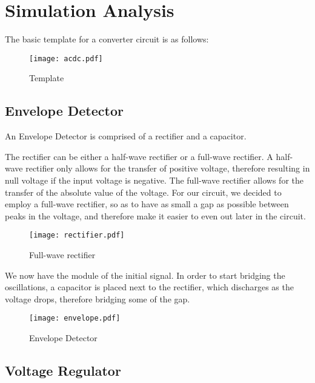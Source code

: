 \newpage

\section{Simulation Analysis}
\label{sec:simulation}

The basic template for a converter circuit is as follows:

\begin{figure}[H]
        \centering
        \texttt{[image: acdc.pdf]}
        \caption{Template}
        \label{acdc}
\end{figure}

\subsection{Envelope Detector}

An Envelope Detector is comprised of a rectifier and a capacitor.

The rectifier can be either a half-wave rectifier or a full-wave rectifier. A half-wave rectifier only allows for the transfer of positive voltage, therefore resulting in null voltage if the input voltage is negative. The full-wave rectifier allows for the transfer of the absolute value of the voltage. For our circuit, we decided to employ a full-wave rectifier, so as to have as small a gap as possible between peaks in the voltage, and therefore make it easier to even out later in the circuit.

\begin{figure}[H]
        \centering
        \texttt{[image: rectifier.pdf]}
        \caption{Full-wave rectifier}
        \label{rectifier}
\end{figure}

We now have the module of the initial signal. In order to start bridging the oscillations, a capacitor is placed next to the rectifier, which discharges as the voltage drops, therefore bridging some of the gap.

\begin{figure}[H]
        \centering
        \texttt{[image: envelope.pdf]}
        \caption{Envelope Detector}
        \label{envelope}
\end{figure}

\subsection{Voltage Regulator}

